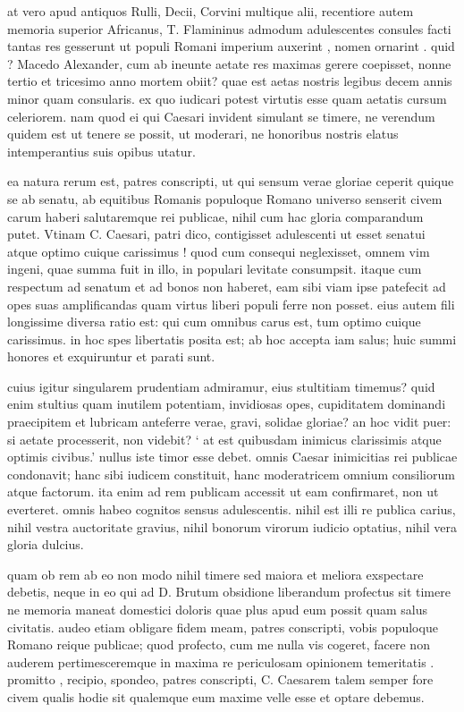  at vero apud antiquos Rulli, Decii, Corvini multique alii, recentiore autem memoria superior Africanus, T. Flamininus admodum adulescentes consules facti tantas res gesserunt ut populi Romani imperium auxerint , nomen ornarint . quid ? Macedo Alexander, cum ab ineunte aetate res maximas gerere coepisset, nonne tertio et tricesimo anno mortem obiit? quae est aetas nostris legibus decem annis minor quam consularis. ex quo iudicari potest virtutis esse quam aetatis cursum celeriorem. nam quod ei qui Caesari invident simulant se timere, ne verendum quidem est ut tenere se possit, ut moderari, ne honoribus nostris elatus intemperantius suis opibus utatur.

 ea natura rerum est, patres conscripti, ut qui sensum verae gloriae ceperit quique se ab senatu, ab equitibus Romanis populoque Romano universo senserit civem carum haberi salutaremque rei publicae, nihil cum hac gloria comparandum putet. Vtinam C. Caesari, patri dico, contigisset adulescenti ut esset senatui atque optimo cuique carissimus ! quod cum consequi neglexisset, omnem vim ingeni, quae summa fuit in illo, in populari levitate consumpsit. itaque cum respectum ad senatum et ad bonos non haberet, eam sibi viam ipse patefecit ad opes suas amplificandas quam virtus liberi populi ferre non posset. eius autem fili longissime diversa ratio est: qui cum omnibus carus est, tum optimo cuique carissimus. in hoc spes libertatis posita est; ab hoc accepta iam salus; huic summi honores et exquiruntur et parati sunt.

 cuius igitur singularem prudentiam admiramur, eius stultitiam timemus? quid enim stultius quam inutilem potentiam, invidiosas opes, cupiditatem dominandi praecipitem et lubricam anteferre verae, gravi, solidae gloriae? an hoc vidit puer: si aetate processerit, non videbit? ` at est quibusdam inimicus clarissimis atque optimis civibus.' nullus iste timor esse debet. omnis Caesar inimicitias rei publicae condonavit; hanc sibi iudicem constituit, hanc moderatricem omnium consiliorum atque factorum. ita enim ad rem publicam accessit ut eam confirmaret, non ut everteret. omnis habeo cognitos sensus adulescentis. nihil est illi re publica carius, nihil vestra auctoritate gravius, nihil bonorum virorum iudicio optatius, nihil vera gloria dulcius.

 quam ob rem ab eo non modo nihil timere sed maiora et meliora exspectare debetis, neque in eo qui ad D. Brutum obsidione liberandum profectus sit timere ne memoria maneat domestici doloris quae plus apud eum possit quam salus civitatis. audeo etiam obligare fidem meam, patres conscripti, vobis populoque Romano reique publicae; quod profecto, cum me nulla vis cogeret, facere non auderem pertimesceremque in maxima re periculosam opinionem temeritatis . promitto , recipio, spondeo, patres conscripti, C. Caesarem talem semper fore civem qualis hodie sit qualemque eum maxime velle esse et optare debemus.

